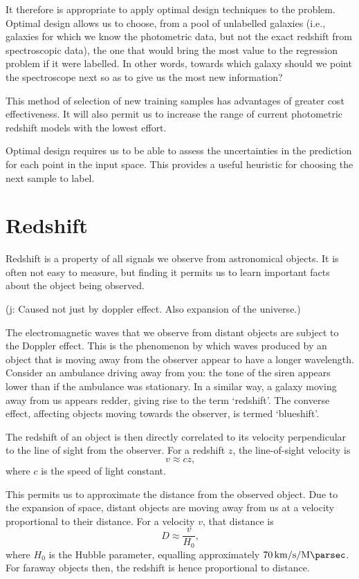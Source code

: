 \documentclass[11pt,twoside]{report}
\newcommand\jakub[1]{{\color{red}(j: #1)}}
\begin{document}
It therefore is appropriate to apply optimal design techniques to the problem. Optimal design allows us to choose, from a pool of unlabelled galaxies (i.e., galaxies for which we know the photometric data, but not the exact redshift from spectroscopic data), the one that would bring the most value to the regression problem if it were labelled. In other words, towards which galaxy should we point the spectroscope next so as to give us the most new information?

This method of selection of new training samples has advantages of greater cost effectiveness. It will also permit us to increase the range of current photometric redshift models with the lowest effort.

Optimal design requires us to be able to assess the uncertainties in the prediction for each point in the input space. This provides a useful heuristic for choosing the next sample to label.

\section{Redshift}
  Redshift is a property of all signals we observe from astronomical objects. It is often not easy to measure, but finding it permits us to learn important facts about the object being observed.

  \jakub{Caused not just by doppler effect. Also expansion of the universe.}

  The electromagnetic waves that we observe from distant objects are subject to the Doppler effect. This is the phenomenon by which waves produced by an object that is moving away from the observer appear to have a longer wavelength. Consider an ambulance driving away from you: the tone of the siren appears lower than if the ambulance was stationary. In a similar way, a galaxy moving away from us appears redder, giving rise to the term `redshift'. The converse effect, affecting objects moving towards the observer, is termed `blueshift'.

  The redshift of an object is then directly correlated to its velocity perpendicular to the line of sight from the observer. For a redshift $z$, the line-of-sight velocity is\[
      v \approx cz \text{,}
  \] where $c$ is the speed of light constant.

  This permits us to approximate the distance from the observed object. Due to the expansion of space, distant objects are moving away from us at a velocity proportional to their distance. For a velocity $v$, that distance is \[
      D \approx \frac{v}{H_0} \text{,}
  \] where $H_0$ is the Hubble parameter, equalling approximately $\SI{70}{\kilo\meter\per\second\per\mega\parsec}$. For faraway objects then, the redshift is hence proportional to distance.
\end{document}
